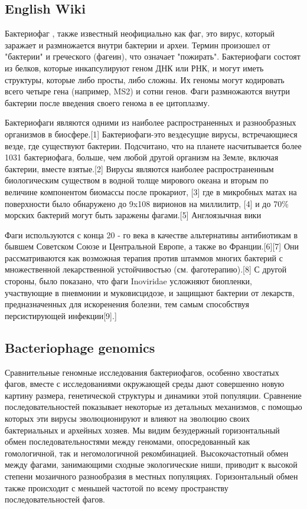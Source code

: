 \documentclass[a4paper,12pt]{article}
\begin{document}
	\subsection{English Wiki}
	\par{Бактериофаг , также известный неофициально как фаг, это вирус, который
	заражает и размножается внутри бактерии и археи. Термин произошел от "бактерии" и греческого (фагеин), что
	означает "пожирать". Бактериофаги состоят из белков, которые инкапсулируют геном ДНК или РНК, и могут иметь
	структуры, которые либо просты, либо сложны. Их геномы могут кодировать всего четыре гена (например, MS2) и сотни
	генов. Фаги размножаются внутри бактерии после введения своего генома в ее цитоплазму.}
	
	\par{Бактериофаги являются одними из наиболее распространенных и разнообразных организмов в биосфере.[1]
	Бактериофаги-это вездесущие вирусы, встречающиеся везде, где существуют бактерии. Подсчитано, что на планете
	насчитывается более 1031 бактериофага, больше, чем любой другой организм на Земле, включая бактерии, вместе
	взятые.[2] Вирусы являются наиболее распространенным биологическим существом в водной толще мирового океана и вторым
	по величине компонентом биомассы после прокариот, [3] где в микробных матах на поверхности было обнаружено до 9x108
	вирионов на миллилитр, [4] и до 70\% морских бактерий могут быть заражены фагами.[5] Англоязычная вики}

    \par{Фаги используются с конца 20 - го века в качестве альтернативы антибиотикам в бывшем Советском Союзе и
    Центральной Европе, а также во Франции.[6][7] Они рассматриваются как возможная терапия против штаммов многих
    бактерий с множественной лекарственной устойчивостью (см. фаготерапию).[8] С другой стороны, было показано, что фаги
    Inoviridae усложняют биопленки, участвующие в пневмонии и муковисцидозе, и защищают бактерии от лекарств,
    предназначенных для искоренения болезни, тем самым способствуя персистирующей инфекции[9].]}
    
    \subsection{Bacteriophage genomics \cite{genomics}}
    \par{Сравнительные геномные исследования бактериофагов, особенно хвостатых фагов, вместе с исследованиями окружающей
    среды дают совершенно новую картину размера, генетической структуры и динамики этой популяции. Сравнение
    последовательностей показывает некоторые из детальных механизмов, с помощью которых эти вирусы эволюционируют и
    влияют на эволюцию своих бактериальных и архейных хозяев. Мы видим безудержный горизонтальный обмен
    последовательностями между геномами, опосредованный как гомологичной, так и негомологичной рекомбинацией.
    Высокочастотный обмен между фагами, занимающими сходные экологические ниши, приводит к высокой степени мозаичного
    разнообразия в местных популяциях. Горизонтальный обмен также происходит с меньшей частотой по всему пространству
    последовательностей фагов.}
    
\end{document}
